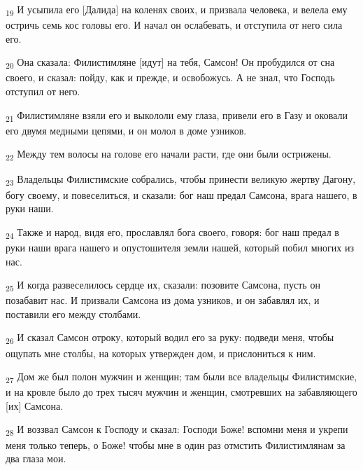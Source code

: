 \begin{tcolorbox}
\textsubscript{19} И усыпила его [Далида] на коленях своих, и призвала человека, и велела ему остричь семь кос головы его. И начал он ослабевать, и отступила от него сила его.
\end{tcolorbox}
\begin{tcolorbox}
\textsubscript{20} Она сказала: Филистимляне [идут] на тебя, Самсон! Он пробудился от сна своего, и сказал: пойду, как и прежде, и освобожусь. А не знал, что Господь отступил от него.
\end{tcolorbox}
\begin{tcolorbox}
\textsubscript{21} Филистимляне взяли его и выкололи ему глаза, привели его в Газу и оковали его двумя медными цепями, и он молол в доме узников.
\end{tcolorbox}
\begin{tcolorbox}
\textsubscript{22} Между тем волосы на голове его начали расти, где они были острижены.
\end{tcolorbox}
\begin{tcolorbox}
\textsubscript{23} Владельцы Филистимские собрались, чтобы принести великую жертву Дагону, богу своему, и повеселиться, и сказали: бог наш предал Самсона, врага нашего, в руки наши.
\end{tcolorbox}
\begin{tcolorbox}
\textsubscript{24} Также и народ, видя его, прославлял бога своего, говоря: бог наш предал в руки наши врага нашего и опустошителя земли нашей, который побил многих из нас.
\end{tcolorbox}
\begin{tcolorbox}
\textsubscript{25} И когда развеселилось сердце их, сказали: позовите Самсона, пусть он позабавит нас. И призвали Самсона из дома узников, и он забавлял их, и поставили его между столбами.
\end{tcolorbox}
\begin{tcolorbox}
\textsubscript{26} И сказал Самсон отроку, который водил его за руку: подведи меня, чтобы ощупать мне столбы, на которых утвержден дом, и прислониться к ним.
\end{tcolorbox}
\begin{tcolorbox}
\textsubscript{27} Дом же был полон мужчин и женщин; там были все владельцы Филистимские, и на кровле было до трех тысяч мужчин и женщин, смотревших на забавляющего [их] Самсона.
\end{tcolorbox}
\begin{tcolorbox}
\textsubscript{28} И воззвал Самсон к Господу и сказал: Господи Боже! вспомни меня и укрепи меня только теперь, о Боже! чтобы мне в один раз отмстить Филистимлянам за два глаза мои.
\end{tcolorbox}

